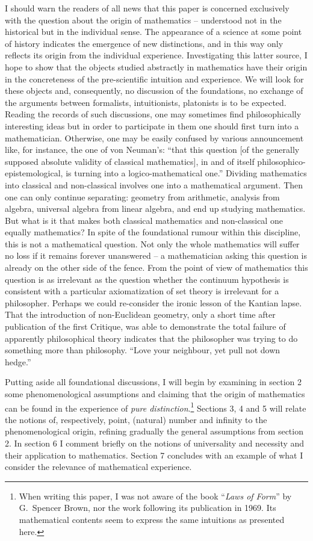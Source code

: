 I should warn the readers of all news that this paper is concerned exclusively
 with the question about the origin of mathematics -- understood not in the
historical but in the individual sense. The appearance of a science at some
point of history indicates the emergence of new distinctions, and in this way
only reflects its origin from the individual experience. Investigating this
latter source, I hope to show that the objects studied abstractly in 
mathematics have their origin in the concreteness of the pre-scientific 
intuition and experience. We will look for these objects and, consequently,
no discussion of the 
foundations, no exchange of the arguments between formalists, intuitionists, 
platonists is to be expected. Reading the records of such discussions, one may
 sometimes find philosophically interesting ideas but in order to participate 
in them one should first turn into a mathematician. Otherwise, one may be 
easily confused by various announcement like, for instance, the one of von 
Neuman's: ``that this question [of the generally supposed absolute validity of
 classical mathematics], in and of itself philosophico-epistemological, is 
turning into a logico-mathematical one.'' Dividing mathematics into classical
 and non-classical involves one into a mathematical argument. Then one can 
only continue separating: geometry from arithmetic, analysis from algebra, 
universal algebra from linear algebra, and end up studying mathematics. But 
what is it that makes both classical mathematics and non-classical one equally
 mathematics? In spite of the foundational rumour within this discipline, this
 is not a mathematical question. Not only the whole mathematics will suffer no
 loss if it remains forever unanswered -- a mathematician asking this question
 is already on the other side of the fence. From the point of view of 
mathematics this question is as irrelevant as the question whether the 
continuum hypothesis is consistent with a particular axiomatization of set 
theory is irrelevant for a philosopher. Perhaps we could re-consider the 
ironic lesson of the Kantian lapse. That the introduction of non-Euclidean 
geometry, only a short time after publication of the first Critique, was able 
to demonstrate the total failure of apparently philosophical theory indicates 
that the philosopher was trying to do something more than philosophy. ``Love your neighbour, yet pull not down hedge.''

Putting aside all foundational discussions, I will begin by examining in 
section 2 some phenomenological assumptions and claiming that the origin of 
mathematics can be found in the experience of {\em pure distinction}.\footnote{When
writing this paper, I was not aware of the book ``{\em Laws of Form}'' by 
G.~Spencer Brown, nor the work following its publication in 1969. Its mathematical
contents seem to express the same intuitions as presented here.} Sections 3, 4 
and 5 will relate the notions of, respectively, point, (natural) number and 
infinity to the phenomenological origin, refining gradually the general 
assumptions from section 2. In section 6 I comment briefly on the notions of 
universality and necessity and their application to mathematics. Section 7 
concludes with an example of what I consider the relevance of mathematical 
experience.

